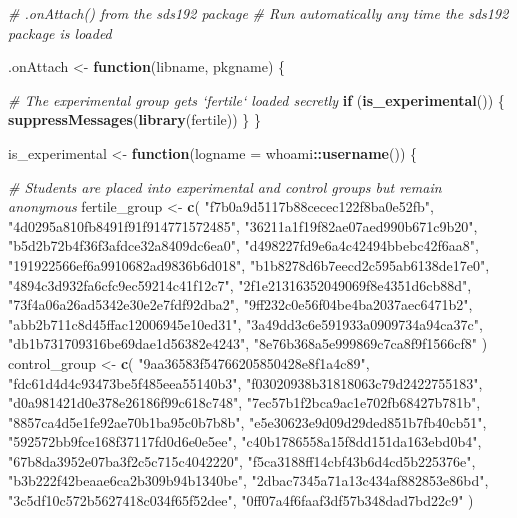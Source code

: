 \documentclass[12pt,twoside]{reedthesis}
\newenvironment{Shaded}{\begin{snugshade}}{\end{snugshade}}
\newcommand{\KeywordTok}[1]{\textcolor[rgb]{0.13,0.29,0.53}{\textbf{#1}}}
\newcommand{\DataTypeTok}[1]{\textcolor[rgb]{0.13,0.29,0.53}{#1}}
\newcommand{\StringTok}[1]{\textcolor[rgb]{0.31,0.60,0.02}{#1}}
\newcommand{\CommentTok}[1]{\textcolor[rgb]{0.56,0.35,0.01}{\textit{#1}}}
\newcommand{\ControlFlowTok}[1]{\textcolor[rgb]{0.13,0.29,0.53}{\textbf{#1}}}
\newcommand{\OperatorTok}[1]{\textcolor[rgb]{0.81,0.36,0.00}{\textbf{#1}}}
\newcommand{\NormalTok}[1]{#1}
\begin{document}
\begin{Shaded}
\begin{Highlighting}[]
\CommentTok{# .onAttach() from the sds192 package}
\CommentTok{# Run automatically any time the sds192 package is loaded}

\NormalTok{.onAttach <-}\StringTok{ }\ControlFlowTok{function}\NormalTok{(libname, pkgname) \{}

  \CommentTok{# The experimental group gets `fertile` loaded secretly}
  \ControlFlowTok{if}\NormalTok{ (}\KeywordTok{is_experimental}\NormalTok{()) \{}
    \KeywordTok{suppressMessages}\NormalTok{(}\KeywordTok{library}\NormalTok{(fertile))}
\NormalTok{  \}}
\NormalTok{\}}

\NormalTok{is_experimental <-}\StringTok{ }\ControlFlowTok{function}\NormalTok{(}\DataTypeTok{logname =}\NormalTok{ whoami}\OperatorTok{::}\KeywordTok{username}\NormalTok{()) \{}
  
  \CommentTok{# Students are placed into experimental and control groups but remain anonymous}
\NormalTok{  fertile_group <-}\StringTok{ }\KeywordTok{c}\NormalTok{(}
    \StringTok{"f7b0a9d5117b88cecec122f8ba0e52fb"}\NormalTok{, }\StringTok{"4d0295a810fb8491f91f914771572485"}\NormalTok{, }
    \StringTok{"36211a1f19f82ae07aed990b671c9b20"}\NormalTok{, }\StringTok{"b5d2b72b4f36f3afdce32a8409dc6ea0"}\NormalTok{,}
    \StringTok{"d498227fd9e6a4c42494bbebc42f6aa8"}\NormalTok{, }\StringTok{"191922566ef6a9910682ad9836b6d018"}\NormalTok{, }
    \StringTok{"b1b8278d6b7eecd2c595ab6138de17e0"}\NormalTok{, }\StringTok{"4894c3d932fa6cfc9ec59214c41f12c7"}\NormalTok{,}
    \StringTok{"2f1e21316352049069f8e4351d6cb88d"}\NormalTok{, }\StringTok{"73f4a06a26ad5342e30e2e7fdf92dba2"}\NormalTok{, }
    \StringTok{"9ff232c0e56f04be4ba2037aec6471b2"}\NormalTok{, }\StringTok{"abb2b711c8d45ffac12006945e10ed31"}\NormalTok{,}
    \StringTok{"3a49dd3c6e591933a0909734a94ca37c"}\NormalTok{, }\StringTok{"db1b731709316be69dae1d56382e4243"}\NormalTok{, }
    \StringTok{"8e76b368a5e999869c7ca8f9f1566cf8"}
\NormalTok{  )}
\NormalTok{  control_group <-}\StringTok{ }\KeywordTok{c}\NormalTok{(}
    \StringTok{"9aa36583f54766205850428e8f1a4c89"}\NormalTok{, }\StringTok{"fdc61d4d4c93473be5f485eea55140b3"}\NormalTok{, }
    \StringTok{"f03020938b31818063c79d2422755183"}\NormalTok{, }\StringTok{"d0a981421d0e378e26186f99c618c748"}\NormalTok{,}
    \StringTok{"7ec57b1f2bca9ac1e702fb68427b781b"}\NormalTok{, }\StringTok{"8857ca4d5e1fe92ae70b1ba95c0b7b8b"}\NormalTok{, }
    \StringTok{"e5e30623e9d09d29ded851b7fb40cb51"}\NormalTok{, }\StringTok{"592572bb9fce168f37117fd0d6e0e5ee"}\NormalTok{,}
    \StringTok{"c40b1786558a15f8dd151da163ebd0b4"}\NormalTok{, }\StringTok{"67b8da3952e07ba3f2c5c715c4042220"}\NormalTok{, }
    \StringTok{"f5ca3188ff14cbf43b6d4cd5b225376e"}\NormalTok{, }\StringTok{"b3b222f42beaae6ca2b309b94b1340be"}\NormalTok{,}
    \StringTok{"2dbac7345a71a13c434af882853e86bd"}\NormalTok{, }\StringTok{"3c5df10c572b5627418c034f65f52dee"}\NormalTok{, }
    \StringTok{"0ff07a4f6faaf3df57b348dad7bd22c9"}
\NormalTok{  )}
  

\end{Highlighting}
\end{Shaded}
\end{document}
